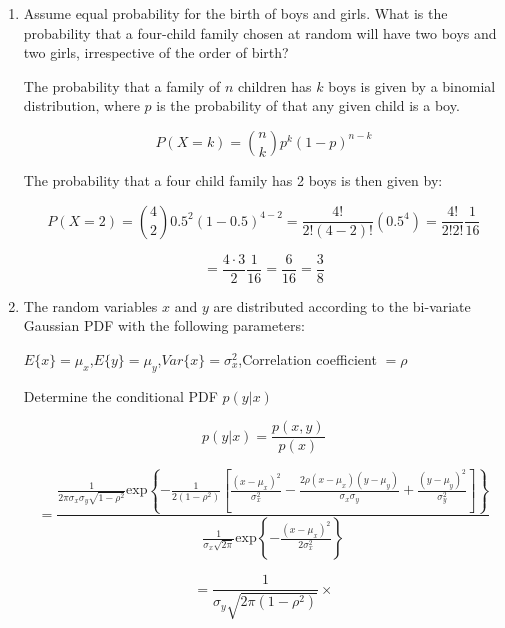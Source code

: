 \documentclass[fleqn]{article}
\begin{document}
\begin{enumerate}
		\item Assume equal probability for the birth of boys and girls. What is the probability that a four-child family chosen at random will have two boys and two girls, irrespective of the order of birth?
		
		The probability that a family of $n$ children has $k$ boys is given by a binomial distribution, where $p$ is the probability of that any given child is a boy.
		 
		\begin{equation*}
			P(X = k) = \binom{n}{k}p^k(1-p)^{n-k}
		\end{equation*}
		
		The probability that a four child family has 2 boys is then given by:
		
		\begin{equation*}
			P(X = 2) = \binom{4}{2}0.5^2(1-0.5)^{4-2} = \frac{4!}{2!(4-2)!}(0.5^4) = \frac{4!}{2!2!}\frac{1}{16} 
		\end{equation*}
		
		\begin{equation*}
			= \frac{4 \cdot 3}{2}\frac{1}{16} = \frac{6}{16} = \frac{3}{8}
		\end{equation*}
		
		\item The random variables $x$ and $y$ are distributed according to the bi-variate Gaussian PDF with the following parameters:
		
		$E\{x\} = \mu_x$,\quad$E\{y\} = \mu_y$,\quad$Var\{x\} = \sigma_x^2$,\quad Correlation coefficient $ = \rho$
		
		Determine the conditional PDF $p(y|x)$
		
		\begin{equation*}		
			p(y|x) = \frac{p(x,y)}{p(x)}
		\end{equation*}
		
		\begin{equation*}
			 = \frac{\frac{1}{2\pi\sigma_x\sigma_y\sqrt{1-\rho^2}}\text{exp}\left\{-\frac{1}{2(1-\rho^2)}\left[\frac{(x-\mu_x)^2}{\sigma_x^2}-\frac{2\rho(x-\mu_x)(y-\mu_y)}{\sigma_x\sigma_y}+\frac{(y-\mu_y)^2}{\sigma_y^2}\right]\right\}}{\frac{1}{\sigma_x\sqrt{2\pi}}\text{exp}\left\{-\frac{(x-\mu_x)^2}{2\sigma_x^2}\right\}}
		\end{equation*}
		
		\begin{equation*}
			= \frac{1}{\sigma_y\sqrt{2\pi(1-\rho^2)}} \times
		\end{equation*}
	

\end{enumerate}
\end{document}
